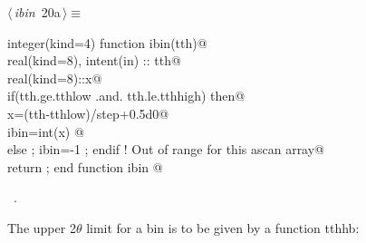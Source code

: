 \documentclass[10pt,a4paper,notitlepage]{article}
\begin{document}
\begin{flushleft} \small
\begin{minipage}{\linewidth}\label{scrap23}\raggedright\small
{} $\langle\,${\it ibin}\nobreak\ {\footnotesize {20a}}$\,\rangle\equiv$
\vspace{-1ex}
\begin{list}{}{} \item
\mbox{}\verb@      integer(kind=4) function ibin(tth)@\\
\mbox{}\verb@      real(kind=8), intent(in) :: tth@\\
\mbox{}\verb@      real(kind=8)::x@\\
\mbox{}\verb@      if(tth.ge.tthlow .and. tth.le.tthhigh) then@\\
\mbox{}\verb@        x=(tth-tthlow)/step+0.5d0@\\
\mbox{}\verb@        ibin=int(x) @\\
\mbox{}\verb@      else ;  ibin=-1 ; endif       ! Out of range for this ascan array@\\
\mbox{}\verb@      return ; end function ibin                                             @{\NWsep}
\end{list}
\vspace{-1.5ex}
\footnotesize
\begin{list}{}{\setlength{\itemsep}{-\parsep}\setlength{\itemindent}{-\leftmargin}}
\item \NWtxtMacroRefIn\ .

\item{}
\end{list}
\end{minipage}\vspace{4ex}
\end{flushleft}
The upper 2$\theta$ limit for a bin is to be given by a function tthhb: 
\end{document}
